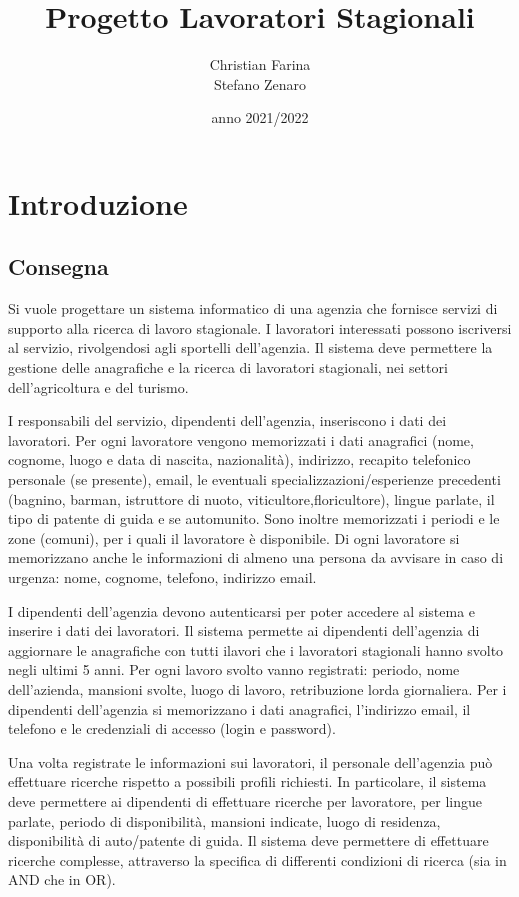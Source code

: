 \documentclass[ 4paper,11pt,openany]{book}
\title{Progetto Lavoratori Stagionali}
\author{Christian Farina\\Stefano Zenaro}
\date{anno 2021/2022}
\begin{document}
\frontmatter
\maketitle
\tableofcontents 

\mainmatter
\chapter{Introduzione}
\section{Consegna}
Si vuole progettare un sistema informatico di una agenzia che fornisce servizi di supporto alla ricerca di lavoro stagionale. I lavoratori interessati possono iscriversi al servizio, rivolgendosi agli sportelli dell’agenzia. Il sistema deve permettere la gestione delle anagrafiche e la ricerca di lavoratori
stagionali, nei settori dell’agricoltura e del turismo. 

I responsabili del servizio, dipendenti dell’agenzia, inseriscono i dati dei lavoratori. 
Per ogni lavoratore vengono memorizzati i dati anagrafici (nome, cognome, luogo e data di nascita, nazionalità), indirizzo, recapito telefonico personale (se presente), email, le eventuali
specializzazioni/esperienze precedenti (bagnino, barman, istruttore di nuoto, viticultore,floricultore), lingue parlate, il tipo di patente di guida e se automunito. Sono inoltre memorizzati i periodi e le zone (comuni), per i quali il lavoratore è disponibile. Di ogni lavoratore si memorizzano anche le informazioni di almeno una persona da avvisare in caso di urgenza: nome, cognome, telefono, indirizzo email. 

I dipendenti dell’agenzia devono autenticarsi per poter accedere al sistema e inserire i dati dei lavoratori. Il sistema permette ai dipendenti dell’agenzia di aggiornare le anagrafiche con tutti ilavori che i lavoratori stagionali hanno svolto negli ultimi 5 anni. 
Per ogni lavoro svolto vanno registrati: periodo, nome dell’azienda, mansioni svolte, luogo di lavoro, retribuzione lorda giornaliera. Per i dipendenti dell’agenzia si memorizzano i dati anagrafici, l’indirizzo email, il telefono e le credenziali di accesso (login e password).

Una volta registrate le informazioni sui lavoratori, il personale dell’agenzia può effettuare ricerche rispetto a possibili profili richiesti.
In particolare, il sistema deve permettere ai dipendenti di effettuare ricerche per lavoratore, per lingue parlate, periodo di disponibilità, mansioni indicate, luogo di residenza, disponibilità di auto/patente di guida. Il sistema deve permettere di effettuare ricerche complesse, attraverso la specifica di differenti condizioni di ricerca (sia in AND che in OR).
\end{document}
